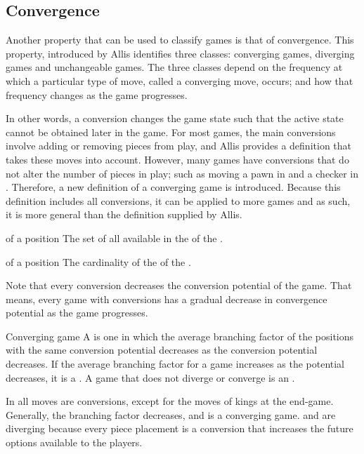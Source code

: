 \subsection{Convergence}
\label{sec:games:convergence}
Another property that can be used to classify games is that of convergence.  This property, introduced by Allis \cite{allis:which} identifies three classes:  converging games, diverging games and unchangeable games. The three classes depend on the frequency at which a particular type of move, called a converging move, occurs; and how that frequency changes as the game progresses.  


In other words, a conversion changes the game state such that the active state cannot be obtained later in the game. For most games, the main conversions involve adding or removing pieces from play, and Allis \cite{allis:which} provides a definition that takes these moves into account.  However, many games have conversions that do not alter the number of pieces in play; such as moving a pawn in  and a checker in .  Therefore, a new definition of a converging game is introduced. Because this definition includes all conversions, it can be applied to more games and as such, it is more general than the definition supplied by Allis.

 {of a position} {The set of all  available in the  of the .}
 
 {of a position} {The cardinality of the  of the .}


Note that every conversion decreases the conversion potential of the game. That means, every game with conversions has a gradual decrease in convergence potential as the game progresses.  

\begin{definition} {Converging game}
A  is one in which the average branching factor of the positions with the same conversion potential decreases as the conversion potential decreases.  If the average branching factor for a game increases as the potential decreases, it is a . A game that does not diverge or converge is an .
\end{definition}
In  all moves are conversions, except for the moves of kings at the end-game.  Generally, the branching factor decreases, and  is a converging game.  and  are diverging because every piece placement is a conversion that increases the future options available to the players. 

